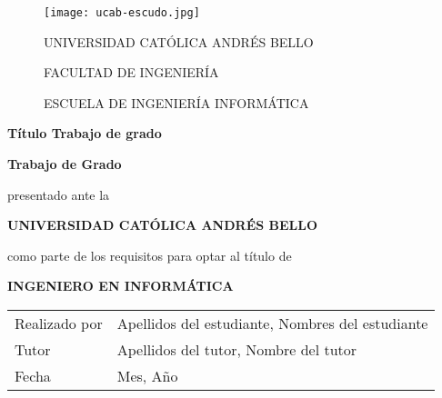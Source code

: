 \newcommand{\touppercase}[1]{\MakeUppercase{#1}}

\newcommand{\universidad}{Universidad Católica Andrés Bello}
\newcommand{\titulo}{Título Trabajo de grado \\}
\newcommand{\estudiante}{Apellidos del estudiante, Nombres del estudiante }
\newcommand{\tutor}{Apellidos del tutor, Nombre del tutor}

\newcommand{\membrete}{
  \normalsize\selectfont
  \touppercase{\universidad} \par
  FACULTAD DE INGENIERÍA \par
  ESCUELA DE INGENIERÍA INFORMÁTICA \par
}

\newcommand{\prelude}{
  \textbf{Trabajo de Grado} \par
  presentado ante la \par
  \touppercase{\textbf{\universidad}} \par
  como parte de los requisitos para optar al título de \par
  \touppercase{\textbf{Ingeniero en Informática}} \par
}

\newcommand{\details}{
  \begin{tabularx}{\textwidth}{X >{\hsize=1.35\hsize}X}
    Realizado por & \estudiante \\
    Tutor         & \tutor      \\
    Fecha         & Mes, Año \\
  \end{tabularx}
}

\begin{center}
  \begin{figure}[h]
    \centering
    \begin{minipage}{0.15\textwidth}
      \texttt{[image: ucab-escudo.jpg]}
    \end{minipage}
    \begin{minipage}{0.7\textwidth}
      \centering
      \renewcommand{\baselinestretch}{1.5}
      \membrete
    \end{minipage}
  \end{figure}
  \vspace*{\fill}
  \textbf{\titulo}
  \vspace*{\fill}
  \prelude
  \vspace*{\fill}
  \details
\end{center}

\clearpage
